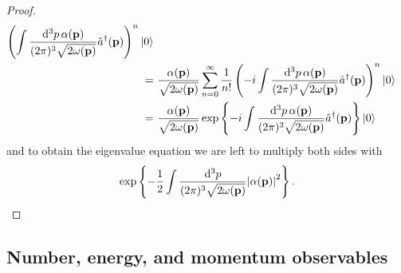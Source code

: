 \begin{proof}
\begin{equation*}
\begin{split}
			\left(
				\int\frac{\dd[3]{p}\alpha(\vb{p})}{(2\pi)^3\sqrt{2\omega(\vb{p})}}
				\hat{a}^\dagger(\vb{p})
			\right)^n
			\ket{0}
			\\
			=&\
			\frac{\alpha(\vb{p})}{\sqrt{2\omega(\vb{p})}}
			\sum_{n=0}^\infty
			\frac{1}{n!}
			\left(
				-i
				\int\frac{\dd[3]{p}\alpha(\vb{p})}{(2\pi)^3\sqrt{2\omega(\vb{p})}}
				\hat{a}^\dagger(\vb{p})
			\right)^n
			\ket{0}
			\\
			=&\
			\frac{\alpha(\vb{p})}{\sqrt{2\omega(\vb{p})}}
			\exp\left\{
				-i
				\int\frac{\dd[3]{p}\alpha(\vb{p})}{(2\pi)^3\sqrt{2\omega(\vb{p})}}
				\hat{a}^\dagger(\vb{p})
			\right\}
			\ket{0}
		\end{split}
	\end{equation*}
	and to obtain the eigenvalue equation we are left to multiply both sides with
	\begin{equation*}
		\exp\left\{
			-
			\frac{1}{2}
			\int\frac{\dd[3]{p}}{(2\pi)^3\sqrt{2\omega(\vb{p})}}
			\abs{\alpha(\vb{p})}^2
		\right\}
		.
	\end{equation*}
\end{proof}

\subsection{Number, energy, and momentum observables}

